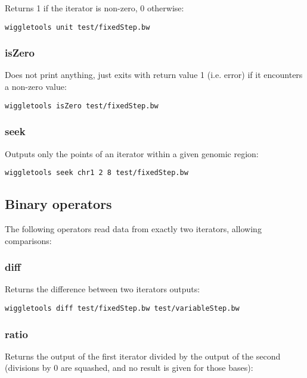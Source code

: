 \documentclass[12pt]{article}
\begin{document}
Returns 1 if the iterator is non-zero, 0 otherwise:

\begin{verbatim}
wiggletools unit test/fixedStep.bw 
\end{verbatim}

\subsubsection{isZero}

Does not print anything, just exits with return value 1 (i.e. error) if it encounters a non-zero value:

\begin{verbatim}
wiggletools isZero test/fixedStep.bw 
\end{verbatim}

\subsubsection{seek}

Outputs only the points of an iterator within a given genomic region:

\begin{verbatim}
wiggletools seek chr1 2 8 test/fixedStep.bw 
\end{verbatim}

\subsection{Binary operators}

The following operators read data from exactly two iterators, allowing comparisons:

\subsubsection{diff}

Returns the difference between two iterators outputs:

\begin{verbatim}
wiggletools diff test/fixedStep.bw test/variableStep.bw 
\end{verbatim}

\subsubsection{ratio}

Returns the output of the first iterator divided by the output of the second (divisions by 0 are squashed, and no result is given for those bases):
\end{document}
